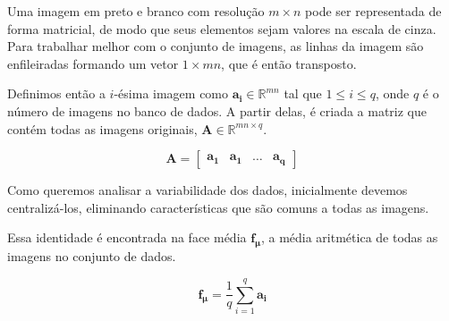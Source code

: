 \documentclass[12pt]{article}
\begin{document}
        Uma imagem em preto e branco com resolução $m \times n$ pode ser representada de forma matricial, de modo que seus elementos sejam valores na escala de cinza. Para trabalhar melhor com o conjunto de imagens, as linhas da imagem são enfileiradas formando um vetor $1 \times mn$, que é então transposto. 


        Definimos então a $i$-ésima imagem como $\boldsymbol{a_i} \in \mathds{R}^{mn}$ tal que $1 \leq i \leq q$, onde $q$ é o número de imagens no banco de dados. A partir delas, é criada a matriz que contém todas as imagens originais, $\boldsymbol{A} \in \mathds{R}^{mn \times q}$.
        
            $$
            \boldsymbol{A} = \begin{bmatrix} \boldsymbol{a_1} & \boldsymbol{a_1} & \ldots & \boldsymbol{a_q} \end{bmatrix}
            $$

        Como queremos analisar a variabilidade dos dados, inicialmente devemos centralizá-los, eliminando características que são comuns a todas as imagens. 
        
        Essa identidade é encontrada na face média $\boldsymbol{f_\mu}$, a média aritmética de todas as imagens no conjunto de dados.
        
            $$
            \boldsymbol{f_\mu} = \frac{1}{q} \sum_{i=1}^{q} \boldsymbol{a_i}
            $$
\end{document}
